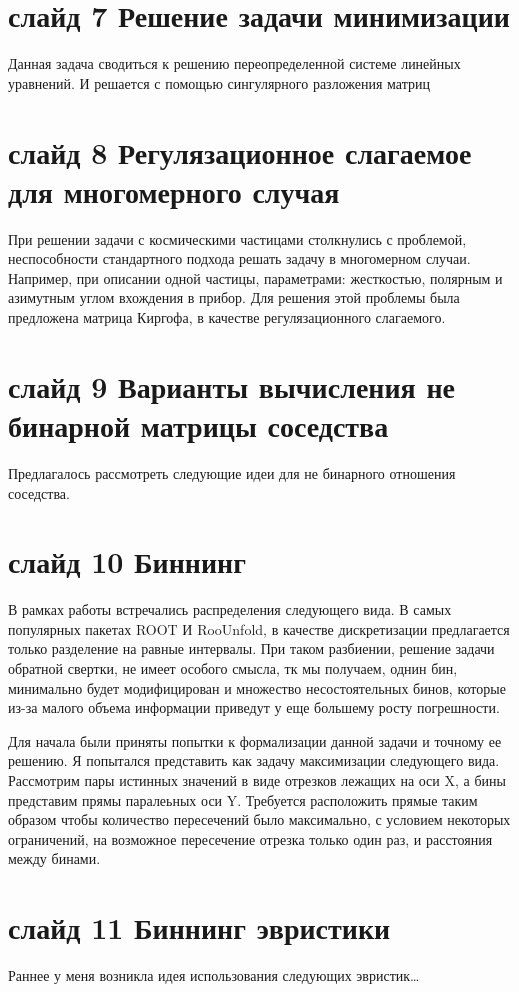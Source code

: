 \documentclass[a4paper,12pt]{diplom}
\begin{document}
\section*{слайд 7 Решение задачи минимизации}
Данная задача сводиться к решению переопределенной системе линейных уравнений. И решается с помощью сингулярного разложения матриц


\section*{слайд 8 Регулязационное слагаемое для многомерного случая}
При решении задачи с космическими частицами столкнулись с проблемой, неспособности стандартного подхода решать задачу в многомерном 
случаи. Например, при описании одной частицы, параметрами: жесткостью, полярным и азимутным углом вхождения в прибор. Для решения 
этой проблемы была предложена матрица Киргофа, в качестве регулязационного слагаемого.


\section*{слайд 9 Варианты вычисления не бинарной матрицы соседства}
Предлагалось рассмотреть следующие идеи для не бинарного отношения соседства.


\section*{слайд 10 Биннинг}
В рамках работы встречались распределения следующего вида. В самых популярных пакетах ROOT И RooUnfold, в качестве дискретизации 
предлагается только разделение на равные интервалы. При таком разбиении, решение задачи обратной свертки, не имеет особого смысла, 
тк мы получаем, однин бин, минимально будет модифицирован и множество несостоятельных бинов, которые из-за малого объема информации 
приведут у еще большему росту погрешности.

Для начала были приняты попытки к формализации данной задачи и точному ее решению. Я попытался представить как задачу максимизации 
следующего вида. Рассмотрим пары истинных значений в виде отрезков лежащих на оси X, а бины представим прямы паралеьных оси Y. 
Требуется расположить прямые таким образом чтобы количество пересечений было максимально, с условием некоторых ограничений, 
на возможное пересечение отрезка только один раз, и расстояния между бинами.

\section*{слайд 11 Биннинг эвристики}
Раннее у меня возникла идея использования следующих эвристик\dots
\end{document}
